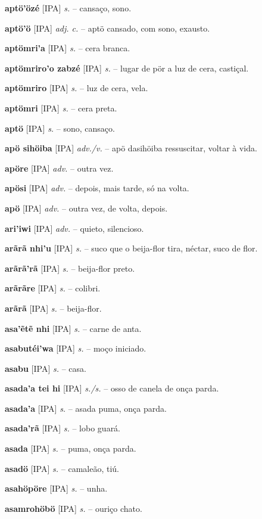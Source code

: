\textbf{aptö'özé} [IPA] \textit{s.} -- cansaço, sono.

\textbf{aptö'ö} [IPA] \textit{adj. c.} -- aptö cansado, com sono, exausto.

\textbf{aptömri'a} [IPA] \textit{s.} -- cera branca.

\textbf{aptömriro'o zabzé} [IPA] \textit{s.} -- lugar de pör a luz de cera, castiçal.

\textbf{aptömriro} [IPA] \textit{s.} -- luz de cera, vela.

\textbf{aptömri} [IPA] \textit{s.} -- cera preta.

\textbf{aptö} [IPA] \textit{s.} -- sono, cansaço.

\textbf{apö sihöiba} [IPA] \textit{adv./v.} -- apö dasihöiba ressuscitar, voltar à vida.

\textbf{apöre} [IPA] \textit{adv.} -- outra vez.

\textbf{apösi} [IPA] \textit{adv.} -- depois, mais tarde, só na volta.

\textbf{apö} [IPA] \textit{adv.} -- outra vez, de volta, depois.

\textbf{ari'iwi} [IPA] \textit{adv.} -- quieto, silencioso.

\textbf{arãrã nhi'u} [IPA] \textit{s.} -- suco que o beija-flor tira, néctar, suco de flor.

\textbf{arãrã'rã} [IPA] \textit{s.} -- beija-flor preto.

\textbf{arãrãre} [IPA] \textit{s.} -- colibri.

\textbf{arãrã} [IPA] \textit{s.} -- beija-flor.

\textbf{asa'ẽtẽ nhi} [IPA] \textit{s.} -- carne de anta.

\textbf{asabutéi'wa} [IPA] \textit{s.} -- moço iniciado.

\textbf{asabu} [IPA] \textit{s.} -- casa.

\textbf{asada'a tei hi} [IPA] \textit{s./s.} -- osso de canela de onça parda.

\textbf{asada'a} [IPA] \textit{s.} -- asada puma, onça parda.

\textbf{asada'rã} [IPA] \textit{s.} -- lobo guará.

\textbf{asada} [IPA] \textit{s.} -- puma, onça parda.

\textbf{asadö} [IPA] \textit{s.} -- camaleão, tiú.

\textbf{asahöpöre} [IPA] \textit{s.} -- unha.

\textbf{asamrohöbö} [IPA] \textit{s.} -- ouriço chato.

